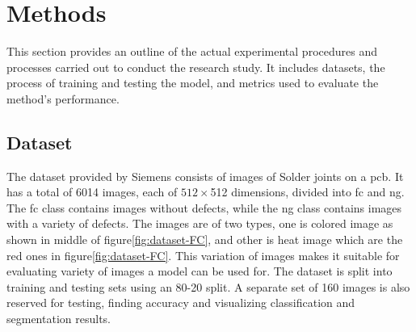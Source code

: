 \chapter{Methods}

This section provides an outline of the actual experimental procedures and processes carried out to conduct the research study. It includes datasets, the process of training and testing the model, and metrics used to evaluate the method's performance.

\section{Dataset}
The dataset provided by Siemens consists of images of Solder joints on a \gls{pcb}. It has a total of 6014 images, each of $512 \times $512 dimensions, divided into \gls{fc} and \gls{ng}. The \gls{fc} class contains images without defects, while the \gls{ng} class contains images with a variety of defects. The images are of two types, one is colored image as shown in middle of figure\ref{fig:dataset-FC}, and other is heat image which are the red ones in figure\ref{fig:dataset-FC}. This variation of images makes it suitable for evaluating variety of images a model can be used for. The dataset is split into training and testing sets using an 80-20 split. A separate set of 160 images is also reserved for testing, finding accuracy and visualizing classification and segmentation results.

